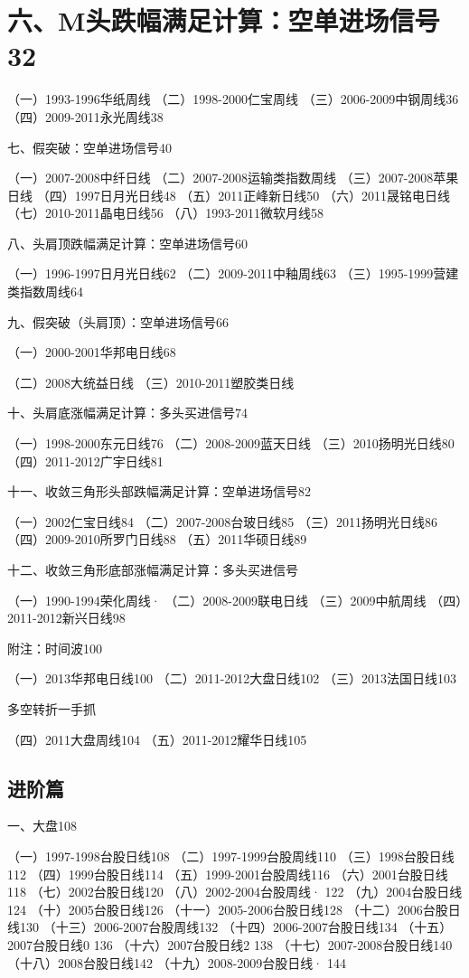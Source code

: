 \documentclass{article}
\begin{document}
\section{六、M头跌幅满足计算：空单进场信号32}

（一）1993-1996华纸周线 （二）1998-2000仁宝周线 （三）2006-2009中钢周线36 （四）2009-2011永光周线38

七、假突破：空单进场信号40

（一）2007-2008中纤日线 （二）2007-2008运输类指数周线 （三）2007-2008苹果日线 （四）1997日月光日线48 （五）2011正峰新日线50 （六）2011晟铭电日线 （七）2010-2011晶电日线56 （八）1993-2011微软月线58

八、头肩顶跌幅满足计算：空单进场信号60

（一）1996-1997日月光日线62 （二）2009-2011中釉周线63 （三）1995-1999营建类指数周线64

九、假突破（头肩顶）：空单进场信号66

（一）2000-2001华邦电日线68

\clearpage

（二）2008大统益日线 （三）2010-2011塑胶类日线

十、头肩底涨幅满足计算：多头买进信号74

（一）1998-2000东元日线76 （二）2008-2009蓝天日线 （三）2010扬明光日线80 （四）2011-2012广宇日线81

十一、收敛三角形头部跌幅满足计算：空单进场信号82

（一）2002仁宝日线84 （二）2007-2008台玻日线85 （三）2011扬明光日线86 （四）2009-2010所罗门日线88 （五）2011华硕日线89

十二、收敛三角形底部涨幅满足计算：多头买进信号

（一）1990-1994荣化周线· （二）2008-2009联电日线 （三）2009中航周线 （四）2011-2012新兴日线98

附注：时间波100

（一）2013华邦电日线100 （二）2011-2012大盘日线102 （三）2013法国日线103

\clearpage

多空转折一手抓

（四）2011大盘周线104 （五）2011-2012耀华日线105

\subsection{进阶篇}

一、大盘108

（一）1997-1998台股日线108 （二）1997-1999台股周线110 （三）1998台股日线112 （四）1999台股日线114 （五）1999-2001台股周线116 （六）2001台股日线118 （七）2002台股日线120 （八）2002-2004台股周线· 122 （九）2004台股日线124 （十）2005台股日线126 （十一）2005-2006台股日线128 （十二）2006台股日线130 （十三）2006-2007台股周线132 （十四）2006-2007台股日线134 （十五）2007台股日线0 136 （十六）2007台股日线2 138 （十七）2007-2008台股日线140 （十八）2008台股日线142 （十九）2008-2009台股日线· 144
\end{document}
